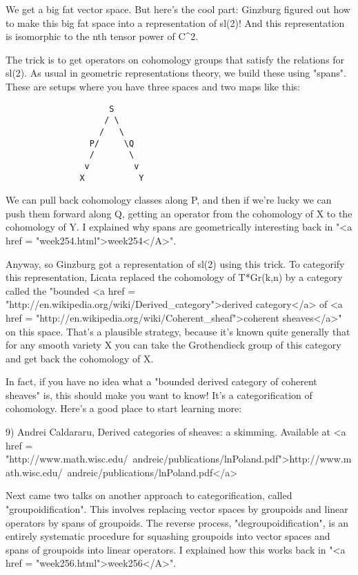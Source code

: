 We get a big fat vector space.  But here's the cool part: Ginzburg
figured out how to make this big fat space into a representation of
sl(2)!  And this representation is isomorphic to the nth tensor power
of C^{2}.

The trick is to get operators on cohomology groups that satisfy the
relations for sl(2).  As usual in geometric representations theory, we
build these using "spans".  These are setups where you have
three spaces and two maps like this:

\begin{verbatim}
                     S
                    / \
                   /   \
                 P/     \Q
                 /       \
                v         v 
               X           Y

\end{verbatim}
    
We can pull back cohomology classes along P, and then if we're lucky
we can push them forward along Q, getting an operator from the
cohomology of X to the cohomology of Y.  I explained why spans are
geometrically interesting back in "<a href = "week254.html">week254</A>".

Anyway, so Ginzburg got a representation of sl(2) using this trick.
To categorify this representation, Licata replaced the cohomology of
T*Gr(k,n) by a category called the "bounded <a href =
"http://en.wikipedia.org/wiki/Derived_category">derived category</a>
of <a href = "http://en.wikipedia.org/wiki/Coherent_sheaf">coherent
sheaves</a>" on this space.  That's a plausible strategy, because
it's known quite generally that for any smooth variety X you can take
the Grothendieck group of this category and get back the cohomology of
X.

In fact, if you have no idea what a "bounded derived category of
coherent sheaves" is, this should make you want to know!  It's a
categorification of cohomology.  Here's a good place to start learning
more:

9) Andrei Caldararu, Derived categories of sheaves: a skimming.
Available at 
<a href = "http://www.math.wisc.edu/~andreic/publications/lnPoland.pdf">http://www.math.wisc.edu/~andreic/publications/lnPoland.pdf</a>

Next came two talks on another approach to categorification, called
"groupoidification".  This involves replacing vector spaces
by groupoids and linear operators by spans of groupoids.  The reverse
process, "degroupoidification", is an entirely systematic
procedure for squashing groupoids into vector spaces and spans of
groupoids into linear operators.  I explained how this works back in
"<a href = "week256.html">week256</A>".

